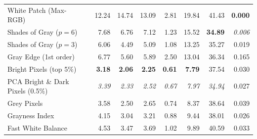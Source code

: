 \begin{longtable}{@{}>{\raggedright\arraybackslash}p{6.8cm}rrrrrrr@{}}
White Patch (Max-RGB)~\cite{white_patch} & 12.24 & 14.74 & 13.09 & 2.81 & 19.84 & 41.43 & \textbf{0.000} \\
Shades of Gray ($p=6$)~\cite{shades_of_gray} & 7.68 & 6.76 & 7.12 & 1.23 & 15.52 & \textbf{34.89} & \textit{0.006} \\
Shades of Gray ($p=3$)~\cite{shades_of_gray} & 6.06 & 4.49 & 5.09 & 1.08 & 13.25 & 35.27 & 0.019 \\
Gray Edge (1st order)~\cite{gray_edge} & 6.77 & 5.60 & 5.89 & 2.50 & 13.04 & 36.34 & 0.165 \\
Bright Pixels (top 5\%)~\cite{bright_pixels} & \textbf{3.18} & \textbf{2.06} & \textbf{2.25} & \textbf{0.61} & \textbf{7.79} & 37.54 & 0.030 \\
PCA Bright \& Dark Pixels (0.5\%)~\cite{cheng2014illuminant} & \textit{3.39} & \textit{2.33} & \textit{2.52} & \textit{0.67} & \textit{7.97} & \textit{34.94} & 0.027 \\
Grey Pixels~\cite{yangGrayPixels} & 3.58 & 2.50 & 2.65 & 0.74 & 8.37 & 38.64 & 0.039 \\
Grayness Index~\cite{qianFindingGrayPixels} & 4.15 & 3.04 & 3.21 & 0.88 & 9.44 & 38.01 & 0.026 \\
Fast White Balance~\cite{fast_wb_greyness} & 4.53 & 3.47 & 3.69 & 1.02 & 9.89 & 40.59 & 0.033 \\
\end{longtable}
\endgroup

